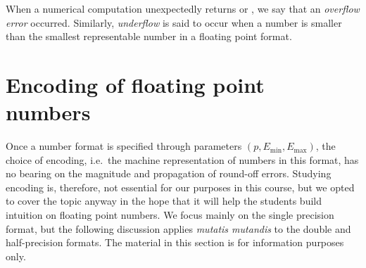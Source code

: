 When a numerical computation unexpectedly returns  or ,
we say that an \emph{overflow error} occurred.
Similarly, \emph{underflow} is said to occur when a number
is smaller than the smallest representable number in a floating point format.


\section{Encoding of floating point numbers~\moreinfo}%
\label{sec:encoding_of_floating_point_numbers}

Once a number format is specified through parameters $(p, E_{\min}, E_{\max})$,
the choice of encoding,
i.e.\ the machine representation of numbers in this format,
has no bearing on the magnitude and propagation of round-off errors.
Studying encoding is, therefore, not essential for our purposes in this course,
but we opted to cover the topic anyway in the hope that it will help the students build intuition on floating point numbers.
We focus mainly on the single precision format,
but the following discussion applies \emph{mutatis mutandis} to the double and half-precision formats.
The material in this section is for information purposes only.

